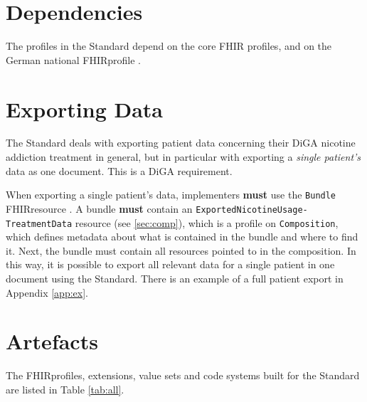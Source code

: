 \documentclass{report}
\def\code#1{\texttt{#1}} %
\newcommand{\fhir}{FHIR\textsuperscript{\textregistered}}
\begin{document}
\section{Dependencies}

The profiles in the Standard depend on the core \fhir \cite{FHIR} profiles, and on the German national \fhir profile \cite{debasis}.

\section{Exporting Data}
\label{sec:export}

The Standard deals with exporting patient data concerning their DiGA nicotine addiction treatment in general,
but in particular with exporting a \textit{single patient's} data as one document. This is a DiGA requirement.

When exporting a single patient's data, implementers \textbf{must} use the \code{Bundle} \fhir resource \cite{bundle}. A bundle \textbf{must} contain an \code{ExportedNicotineUsage-\allowbreak TreatmentData} resource (see \ref{sec:comp}), which is a profile on \code{Composition},
which defines metadata about what is contained in the bundle and where to find it. Next, the bundle must contain all resources pointed to in the composition. In this way, it is possible
to export all relevant data for a single patient in one document using the Standard. There is an example of a full patient export in Appendix \ref{app:ex}.

\section{Artefacts}
The \fhir profiles, extensions, value sets and code systems built for the Standard are listed in Table \ref{tab:all}.
\end{document}
